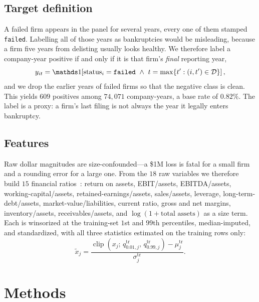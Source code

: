 \documentclass[manuscript,nonacm]{acmart}
\begin{document}
\subsection{Target definition}
A failed firm appears in the panel for several years, every one of them stamped
\texttt{failed}. Labelling all of those years as bankruptcies would be misleading,
because a firm five years from delisting usually looks healthy. We therefore label a
company-year positive if and only if it is that firm's \emph{final} reporting year,
\begin{equation}
y_{it}=\ind\!\left[\text{status}_i=\texttt{failed}\ \wedge\
                    t=\max\{t': (i,t')\in\mathcal{D}\}\right],
\label{eq:target}
\end{equation}
and we drop the earlier years of failed firms so that the negative class is clean. This
yields $609$ positives among $74{,}071$ company-years, a base rate of $0.82\%$. The
label is a proxy: a firm's last filing is not always the year it legally enters
bankruptcy.

\subsection{Features}
Raw dollar magnitudes are size-confounded---a \$1M loss is fatal for a small firm and a
rounding error for a large one. From the $18$ raw variables we therefore build $15$
financial ratios~\cite{altman1968,ohlson1980}: return on assets, EBIT/assets,
EBITDA/assets, working-capital/assets, retained-earnings/assets, sales/assets, leverage,
long-term-debt/assets, market-value/liabilities, current ratio, gross and net margins,
inventory/assets, receivables/assets, and $\log(1+\text{total assets})$ as a size term.
Each is winsorized at the training-set $1$st and $99$th percentiles, median-imputed, and
standardized, with all three statistics estimated on the training rows only:
\begin{equation}
\tilde{x}_{j}=\frac{\operatorname{clip}\!\left(x_{j};\,q^{\text{tr}}_{0.01,j},\,q^{\text{tr}}_{0.99,j}\right)-\mu^{\text{tr}}_{j}}{\sigma^{\text{tr}}_{j}} .
\label{eq:preproc}
\end{equation}

\section{Methods}
\end{document}

